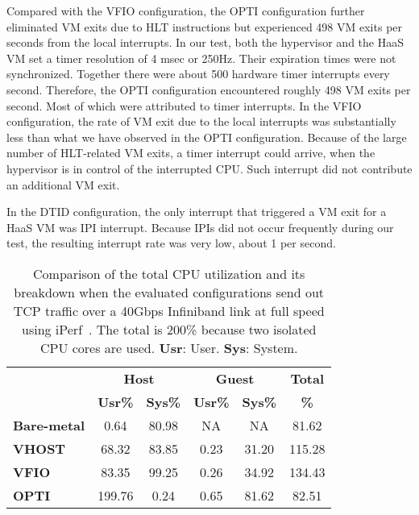 Compared with the VFIO configuration, the OPTI configuration
further eliminated VM exits due to HLT instructions but
experienced 498 VM exits per seconds from the local
interrupts. In our test, both the hypervisor and the HaaS VM
set a timer resolution of 4 msec or 250Hz. Their expiration
times were not synchronized. Together there were about 500
hardware timer interrupts every second. Therefore, the OPTI
configuration encountered roughly 498 VM exits per second.
Most of which were attributed to timer interrupts. In the VFIO
configuration, the rate of VM exit due to the local interrupts
was substantially less than what we have observed in the OPTI
configuration. Because of the large number of HLT-related VM
exits, a timer interrupt could arrive, when the hypervisor is
in control of the interrupted CPU. Such interrupt did not
contribute an additional VM exit.

In the DTID configuration, the only interrupt that triggered a
VM exit for a HaaS VM was IPI interrupt. Because IPIs did not
occur frequently during our test, the resulting interrupt rate
was very low, about 1 per second.

\begin{table}[]
\renewcommand{\arraystretch}{1.2}
\small
\begin{center}
\begin{tabular}{|l|c|c|c|c|c|}
\hline
                    & \multicolumn{2}{c|}{\textbf{Host}}  & \multicolumn{2}{c|}{\textbf{Guest}} & \textbf{Total} \\ \cline{2-5}
                    & \textbf{Usr\%} & \textbf{Sys\%}    & \textbf{Usr\%} & \textbf{Sys\%}    & \textbf{\%}    \\ \hline
\textbf{Bare-metal} & 0.64            & 80.98             & NA              & NA                & 81.62          \\ \hline
\textbf{VHOST}      & 68.32           & 83.85             & 0.23            & 31.20             & 115.28         \\ \hline
\textbf{VFIO}       & 83.35           & 99.25             & 0.26            & 34.92             & 134.43         \\ \hline
\textbf{OPTI}       & 199.76          & 0.24              & 0.65            & 81.62             & 82.51          \\ \hline
\end{tabular}
\end{center}
\caption{Comparison of the total CPU utilization and its
breakdown when the evaluated configurations send out TCP
traffic over a 40Gbps Infiniband link at full speed using
iPerf~\cite{iperf}. The total is 200\% because two isolated
CPU cores are used. \textbf{Usr}: User. \textbf{Sys}: System.}
\label{tab:cpu_utilization_40gbps}
\end{table}

